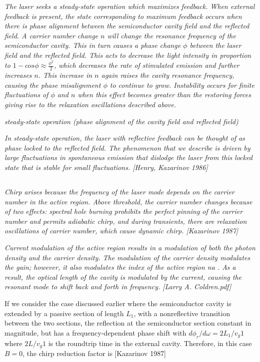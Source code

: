\textit{The laser seeks a steady-state operation which maximizes feedback. When external feedback is present, the state corresponding to maximum feedback occurs when there is phase alignment  between the semiconductor cavity field and the reflected field. A carrier number change $n$ will change the resonance frequency of the semiconductor cavity. This in turn causes a phase change $\phi$ between the laser field and the reflected field. This acts to decrease the light intensity in proportion to $1-cos{\phi}\approx\frac{\phi^2}{2}$, which decreases the rate of stimulated emission and further increases $n$. This increase in $n$ again raises the cavity resonance frequency, causing the phase misalignment $\phi$ to continue to grow. Instability occurs for finite fluctuations of $\phi$ and $n$ when this effect becomes greater than the restoring forces giving rise to the relaxation oscillations described above.}

\textit{steady-state operation (phase alignment of the cavity field and reflected field)}

\textit{In steady-state operation, the laser with reflective feedback can be thought of as phase locked to the reflected field. The phenomenon that we describe is driven by large fluctuations in spontaneous emission that dislodge the laser from this locked state that is stable for small fluctuations. [Henry, Kazarinov 1986]}

\subsection{}
\textit{Chirp arises because the frequency of the laser mode depends on the carrier number in the active region. Above threshold, the carrier number changes because of two effects: spectral hole burning prohibits the perfect pinning of the carrier number and permits adiabatic chirp, and during transients, there are relaxation oscillations of carrier number, which cause dynamic chirp. [Kazarinov 1987]}

\textit{Current modulation of the active region results in a modulation of both the photon density and the carrier density. The modulation of the carrier density modulates the gain; however, it also modulates the index of the active region na . As a result, the optical length of the cavity is modulated by the current, causing the resonant mode to shift back and forth in frequency. [Larry A. Coldren.pdf]}

If we consider the case discussed earlier where the semiconductor cavity is extended by a passive section of length $L_1$, with a nonreflective transition between the two sections, the reflection at the semiconductor section constant in magnitude, but has a frequency-dependent phase shift with $d\phi_r/d\omega = 2L_1/v_g1$ where $2L/v_g1$ is the roundtrip time in the external cavity. Therefore, in this case $B=0$, the chirp reduction factor is [Kazarinov 1987]

